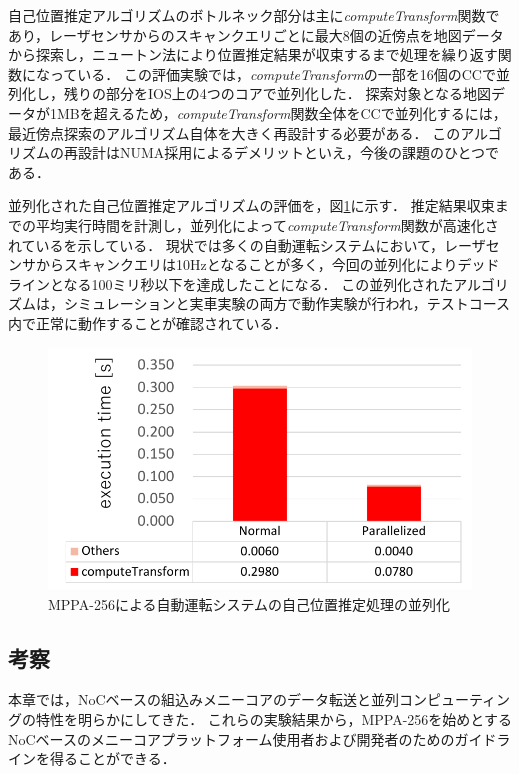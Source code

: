 \documentclass[submit,techrep]{ipsj_v2/UTF8/ipsj}
\begin{document}
自己位置推定アルゴリズムのボトルネック部分は主に\emph{computeTransform}関数であり，レーザセンサからのスキャンクエリごとに最大8個の近傍点を地図データから探索し，ニュートン法により位置推定結果が収束するまで処理を繰り返す関数になっている．
この評価実験では，\emph{computeTransform}の一部を16個のCCで並列化し，残りの部分をIOS上の4つのコアで並列化した．
探索対象となる地図データが1MBを超えるため，\emph{computeTransform}関数全体をCCで並列化するには，最近傍点探索のアルゴリズム自体を大きく再設計する必要がある．
このアルゴリズムの再設計はNUMA採用によるデメリットといえ，今後の課題のひとつである．

並列化された自己位置推定アルゴリズムの評価を，図\ref{fig:ndt_matching}に示す．
推定結果収束までの平均実行時間を計測し，並列化によって\emph{computeTransform}関数が高速化されているを示している．
現状では多くの自動運転システムにおいて，レーザセンサからスキャンクエリは10Hzとなることが多く，今回の並列化によりデッドラインとなる100ミリ秒以下を達成したことになる．
この並列化されたアルゴリズムは，シミュレーションと実車実験の両方で動作実験が行われ，テストコース内で正常に動作することが確認されている．

\begin{figure}[t]
  \centering
  \includegraphics[width=0.9\linewidth]{../figure/BarGraph_ndt_matching.pdf}
  \caption{\label{fig:ndt_matching}
  MPPA-256による自動運転システムの自己位置推定処理の並列化}
\end{figure}


\subsection{考察}
\label{sec:lessons}
本章では，NoCベースの組込みメニーコアのデータ転送と並列コンピューティングの特性を明らかにしてきた．
これらの実験結果から，MPPA-256を始めとするNoCベースのメニーコアプラットフォーム使用者および開発者のためのガイドラインを得ることができる．
\end{document}
